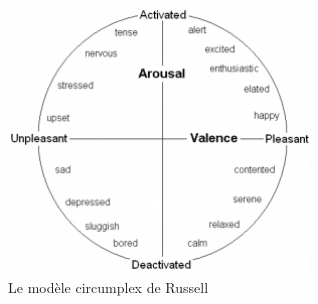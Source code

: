 \begin{figure}
  \centering
  \includegraphics[width=8cm]{./Chapitre1/figures/Circumplex.png}
  \caption{Le modèle circumplex de Russell}
  \label{fig:Circumplex}
\end{figure}
